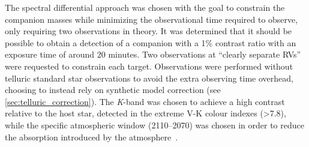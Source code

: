 The spectral differential approach was chosen with the goal to constrain the companion masses while minimizing the observational time required to observe, only requiring two observations in theory.
It was determined that it should be possible to obtain a detection of a companion with a 1\% contrast ratio with an exposure time of around 20 minutes.
Two observations at ``clearly separate {RV}s'' were requested to constrain each target.
Observations were performed without telluric standard star observations to avoid the extra observing time overhead, choosing to instead rely on synthetic model correction (see \cref{sec:telluric_correction}).
The \textit{K}-band was chosen to achieve a high contrast relative to the host star, detected in the extreme V-K colour indexes (>7.8), while the specific atmospheric window (2110--2070\nm{}) was chosen in order to reduce the absorption introduced by the atmosphere~\citep{barnes_hd_2008}.
